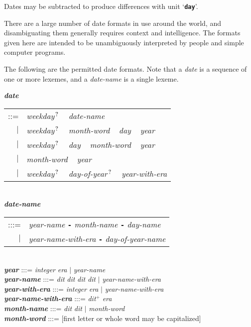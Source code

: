 \documentclass[12pt]{article}
\newcommand{\TT}[1]{{\tt \bfseries #1}}
\newcommand{\emkey}[1]{{\em \bfseries #1}}
\newcommand{\PLUS}[1][]{{$^{+#1}$}}
\newcommand{\QMARK}{{$^{\,\mbox{\footnotesize ?}}$}}
\newenvironment{indpar}[1][0.3in]%
	{\begin{list}{}%
		     {\setlength{\itemsep}{0in}%
		      \setlength{\topsep}{0in}%
		      \setlength{\parsep}{1ex}%
		      \setlength{\labelwidth}{#1}%
		      \setlength{\leftmargin}{#1}%
		      \addtolength{\leftmargin}{\labelsep}}%
	 \item}%
	{\end{list}}
\begin{document}
Dates may be subtracted to produce differences with unit `\TT{day}'.

There are a large number of date formats in use around the world,
and disambiguating them generally requires context and intelligence.
The formats given here are intended to be unambiguously interpreted
by people and simple computer programs.

The following are the permitted date formats.  Note that a {\em date}
is a sequence of one or more lexemes, and a {\em date-name} is a single
lexeme.

\begin{indpar}
\emkey{date} \begin{tabular}[t]{rl}
	      ::= & {\em weekday}\QMARK{} ~ {\em date-name} \\
	      $|$ & {\em weekday}\QMARK{} ~
	            {\em month-word} ~ {\em day} ~ {\em year} \\
	      $|$ & {\em weekday}\QMARK{} ~
	            {\em day} ~ {\em month-word} ~ {\em year} \\
	      $|$ & {\em month-word} ~ {\em year} \\
	      $|$ & {\em weekday}\QMARK{} ~
	            {\em day-of-year}\QMARK{} ~ {\em year-with-era}  \\
	     \end{tabular}
\label{DATE}
\\[1ex]
\emkey{date-name} \begin{tabular}[t]{rl}
	     :::= & {\em year-name} \TT{-} {\em month-name}
	     	                    \TT{-} {\em day-name} \\
	      $|$ & {\em year-name-with-era}  \TT{-} {\em day-of-year-name} \\
	     \end{tabular}
\\[1ex]
\emkey{year} :::=  {\em integer} {\em era} $|$ {\em year-name}
\\[1ex]
\emkey{year-name} :::= {\em dit} {\em dit} {\em dit} {\em dit}
                   $|$ {\em year-name-with-era}
\\[1ex]
\emkey{year-with-era} :::=  {\em integer} {\em era} $|$ {\em year-name-with-era}
\\[1ex]
\emkey{year-name-with-era} :::= {\em dit}\PLUS{} {\em era}
\\[1ex]
\emkey{month-name} :::=  {\em dit} {\em dit} $|$ {\em month-word}
\\[1ex]
\emkey{month-word} :::= [first letter or whole word may be capitalized] \\

\end{indpar}
\end{document}
